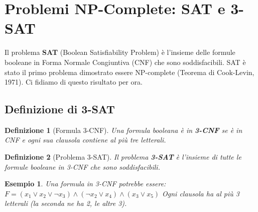 \documentclass[a4paper]{article}
\newtheorem{definition}{Definizione}
\newtheorem{example}{Esempio}
\begin{document}


\section{Problemi NP-Complete: SAT e 3-SAT}

Il problema \textbf{SAT} (Boolean Satisfiability Problem) è l'insieme delle formule booleane in Forma Normale Congiuntiva (CNF) che sono soddisfacibili. SAT è stato il primo problema dimostrato essere NP-complete (Teorema di Cook-Levin, 1971). Ci fidiamo di questo risultato per ora.

\subsection{Definizione di 3-SAT}

\begin{definition}[Formula 3-CNF]
Una formula booleana è in \textbf{3-CNF} se è in CNF e ogni sua clausola contiene \emph{al più} tre letterali.
\end{definition}

\begin{definition}[Problema 3-SAT]
Il problema \textbf{3-SAT} è l'insieme di tutte le formule booleane in 3-CNF che sono soddisfacibili.
\end{definition}

\begin{example}
Una formula in 3-CNF potrebbe essere:
$F = (x_1 \lor x_2 \lor \neg x_3) \land (\neg x_2 \lor x_4) \land (x_3 \lor x_5)$
Ogni clausola ha al più 3 letterali (la seconda ne ha 2, le altre 3).
\end{example}
\end{document}

